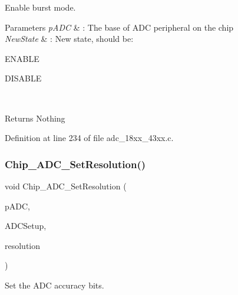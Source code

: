 Enable burst mode. 


\begin{DoxyParams}{Parameters}
{\em p\+A\+DC} & \+: The base of A\+DC peripheral on the chip \\
\hline
{\em New\+State} & \+: New state, should be\+:
\begin{DoxyItemize}
\item E\+N\+A\+B\+LE
\item D\+I\+S\+A\+B\+LE 
\end{DoxyItemize}\\
\hline
\end{DoxyParams}
\begin{DoxyReturn}{Returns}
Nothing 
\end{DoxyReturn}


Definition at line 234 of file adc\+\_\+18xx\+\_\+43xx.\+c.

\mbox{\label{group___a_d_c__18_x_x__43_x_x_ga8d536c4e7b6be7e6f1a77b69e5fbf1eb}} 
\subsubsection{\texorpdfstring{Chip\+\_\+\+A\+D\+C\+\_\+\+Set\+Resolution()}{Chip\_ADC\_SetResolution()}}
{\footnotesize\ttfamily void Chip\+\_\+\+A\+D\+C\+\_\+\+Set\+Resolution (\begin{DoxyParamCaption}\item[{\hyperlink{struct_l_p_c___a_d_c___t}{L\+P\+C\+\_\+\+A\+D\+C\+\_\+T} $\ast$}]{p\+A\+DC,  }\item[{\hyperlink{struct_a_d_c___c_l_o_c_k___s_e_t_u_p___t}{A\+D\+C\+\_\+\+C\+L\+O\+C\+K\+\_\+\+S\+E\+T\+U\+P\+\_\+T} $\ast$}]{A\+D\+C\+Setup,  }\item[{\hyperlink{group___a_d_c__18_x_x__43_x_x_ga515c7ef9570ef08b29f55cd880e2e452}{A\+D\+C\+\_\+\+R\+E\+S\+O\+L\+U\+T\+I\+O\+N\+\_\+T}}]{resolution }\end{DoxyParamCaption})}



Set the A\+DC accuracy bits. 


